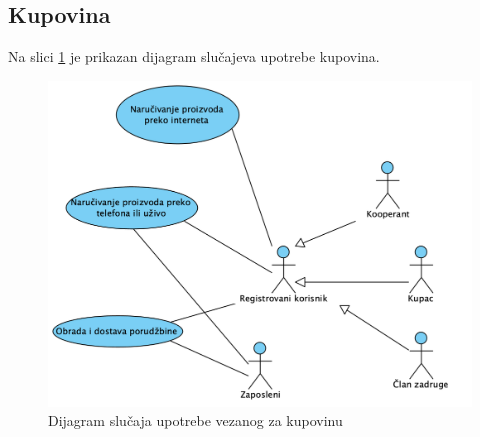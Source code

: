 \documentclass[a4paper]{article}
\begin{document}
\subsection{Kupovina}

Na slici %
\ref{dslucup_kupovina} je prikazan dijagram slučajeva upotrebe kupovina.

\begin{figure}[h!]
    \centering
    \includegraphics[scale=0.64]{images/dslucup_kupovina.png}
    \caption{Dijagram slučaja upotrebe vezanog za kupovinu}
    \label{dslucup_kupovina}
\end{figure}

\clearpage
\end{document}
